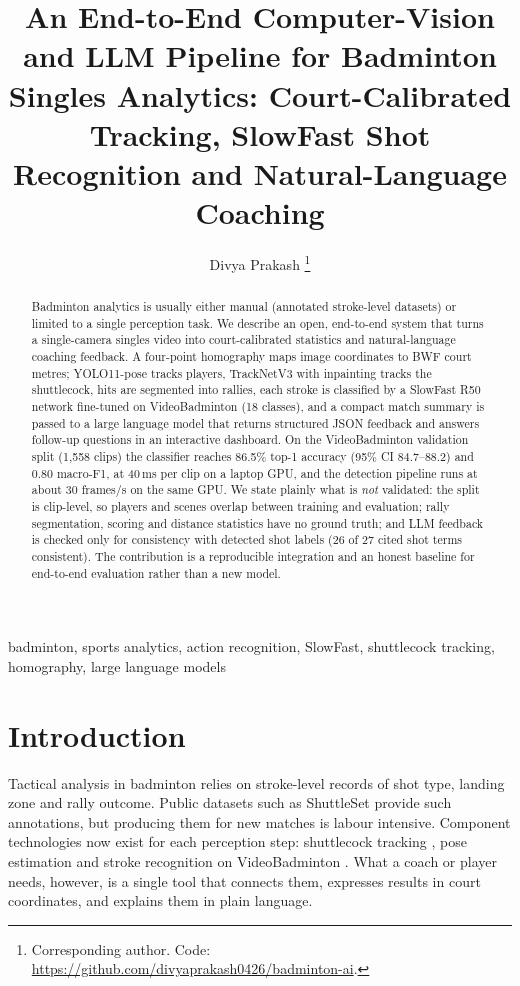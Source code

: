 \documentclass[10pt,journal]{IEEEtran}
\begin{document}
\title{An End-to-End Computer-Vision and LLM Pipeline for Badminton Singles Analytics: Court-Calibrated Tracking, SlowFast Shot Recognition and Natural-Language Coaching}

\author{Divya Prakash%
\thanks{Corresponding author. Code: \url{https://github.com/divyaprakash0426/badminton-ai}.}}

\maketitle

\begin{abstract}
Badminton analytics is usually either manual (annotated stroke-level datasets) or limited to a single perception task. We describe an open, end-to-end system that turns a single-camera singles video into court-calibrated statistics and natural-language coaching feedback. A four-point homography maps image coordinates to BWF court metres; YOLO11-pose tracks players, TrackNetV3 with inpainting tracks the shuttlecock, hits are segmented into rallies, each stroke is classified by a SlowFast R50 network fine-tuned on VideoBadminton (18 classes), and a compact match summary is passed to a large language model that returns structured JSON feedback and answers follow-up questions in an interactive dashboard. On the VideoBadminton validation split (1{,}558 clips) the classifier reaches 86.5\% top-1 accuracy (95\% CI 84.7--88.2) and 0.80 macro-F1, at 40\,ms per clip on a laptop GPU, and the detection pipeline runs at about 30 frames/s on the same GPU. We state plainly what is \emph{not} validated: the split is clip-level, so players and scenes overlap between training and evaluation; rally segmentation, scoring and distance statistics have no ground truth; and LLM feedback is checked only for consistency with detected shot labels (26 of 27 cited shot terms consistent). The contribution is a reproducible integration and an honest baseline for end-to-end evaluation rather than a new model.
\end{abstract}

\begin{IEEEkeywords}
badminton, sports analytics, action recognition, SlowFast, shuttlecock tracking, homography, large language models
\end{IEEEkeywords}

\section{Introduction}
Tactical analysis in badminton relies on stroke-level records of shot type, landing zone and rally outcome. Public datasets such as ShuttleSet \cite{wang2023shuttleset} provide such annotations, but producing them for new matches is labour intensive. Component technologies now exist for each perception step: shuttlecock tracking \cite{huang2019tracknet,chen2023tracknetv3}, pose estimation \cite{jocher2024ultralytics} and stroke recognition on VideoBadminton \cite{li2024videobadminton}. What a coach or player needs, however, is a single tool that connects them, expresses results in court coordinates, and explains them in plain language.
\end{document}
